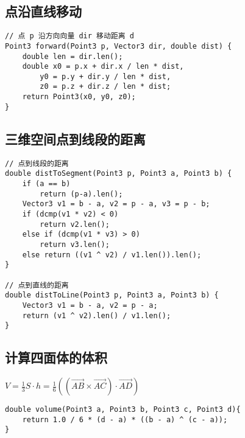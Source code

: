\subsection{点沿直线移动}
\begin{verbatim}
// 点 p 沿方向向量 dir 移动距离 d
Point3 forward(Point3 p, Vector3 dir, double dist) {
    double len = dir.len();
    double x0 = p.x + dir.x / len * dist,
        y0 = p.y + dir.y / len * dist,
        z0 = p.z + dir.z / len * dist;
    return Point3(x0, y0, z0);
}
\end{verbatim}

\subsection{三维空间点到线段的距离}
\begin{verbatim}
// 点到线段的距离
double distToSegment(Point3 p, Point3 a, Point3 b) {
    if (a == b)
        return (p-a).len();
    Vector3 v1 = b - a, v2 = p - a, v3 = p - b;
    if (dcmp(v1 * v2) < 0)
        return v2.len();
    else if (dcmp(v1 * v3) > 0)
        return v3.len();
    else return ((v1 ^ v2) / v1.len()).len();
}    

// 点到直线的距离
double distToLine(Point3 p, Point3 a, Point3 b) {
    Vector3 v1 = b - a, v2 = p - a;
    return (v1 ^ v2).len() / v1.len();
}
\end{verbatim}

\subsection{计算四面体的体积}

$V = \frac{1}{3}S\cdot h = \frac{1}{6}((\vec{AB} \times \vec{AC}) \cdot \vec{AD})$

\begin{verbatim}
double volume(Point3 a, Point3 b, Point3 c, Point3 d){
    return 1.0 / 6 * (d - a) * ((b - a) ^ (c - a));
}
\end{verbatim}